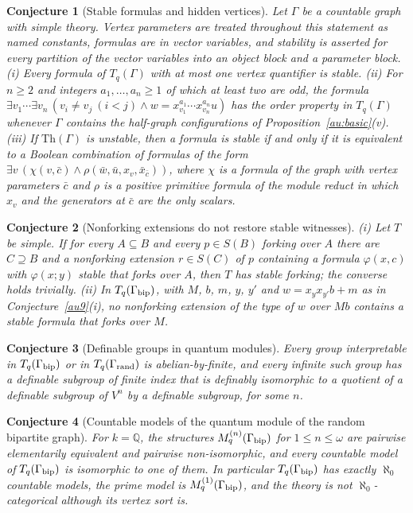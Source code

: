 \documentclass[11pt]{article}
\newtheorem{conjecture}{Conjecture}
\theoremstyle{definition}
\newcommand{\Q}{\mathbb Q}
\providecommand{\Q}{\mathbb Q}
\begin{document}
\begin{conjecture}[Stable formulas and hidden vertices]\label{au12}
Let $\Gamma$ be a countable graph with simple theory.
Vertex parameters are treated throughout this statement as named
constants, formulas are in vector variables, and stability is asserted
for every partition of the vector variables into an object block and a
parameter block.
{\rm(i)} Every formula of $T_q(\Gamma)$ with at most one vertex quantifier
is stable.
{\rm(ii)} For $n\ge2$ and integers $a_1,\dots,a_n\ge1$ of which at least
two are odd, the formula
$\exists v_1\cdots\exists v_n\,(v_i\ne v_j\ (i<j)\wedge w=x_{v_1}^{a_1}\cdots x_{v_n}^{a_n}u)$
has the order property in $T_q(\Gamma)$ whenever $\Gamma$ contains the
half-graph configurations of Proposition~\ref{au:basic}(v).
{\rm(iii)} If $\mathrm{Th}(\Gamma)$ is unstable, then a formula is stable
if and only if it is equivalent
to a Boolean combination of formulas of the form
$\exists v\,(\chi(v,\bar c)\wedge\rho(\bar w,\bar u,x_v,\bar x_{\bar c}))$,
where $\chi$ is a formula of the graph with vertex parameters $\bar c$
and $\rho$ is a positive primitive formula of the module reduct in which
$x_v$ and the generators at $\bar c$ are the only scalars.
\end{conjecture}


\begin{conjecture}[Nonforking extensions do not restore stable witnesses]\label{au13}
{\rm(i)} Let $T$ be simple.  If for every $A\subseteq B$ and every
$p\in S(B)$ forking over $A$ there are $C\supseteq B$ and a nonforking
extension $r\in S(C)$ of $p$ containing a formula $\varphi(x,c)$ with
$\varphi(x;y)$ stable that forks over $A$, then $T$ has stable forking;
the converse holds trivially.
{\rm(ii)} In $T_q(\Gamma_{\rm bip})$, with $M$, $b$, $m$, $y$, $y'$ and
$w=x_yx_{y'}b+m$ as in Conjecture~\ref{au9}(i), no nonforking extension of
the type of $w$ over $Mb$ contains a stable formula that forks over $M$.
\end{conjecture}


\begin{conjecture}[Definable groups in quantum modules]\label{au14}
Every group interpretable in $T_q(\Gamma_{\rm bip})$ or in
$T_q(\Gamma_{\rm rand})$ is abelian-by-finite, and every infinite such group
has a definable subgroup of finite index that is definably isomorphic to
a quotient of a definable subgroup of $V^n$ by a definable subgroup, for
some $n$.
\end{conjecture}


\begin{conjecture}[Countable models of the quantum module of the random bipartite graph]\label{au15}
For $k=\Q$, the structures $M^{(n)}_q(\Gamma_{\rm bip})$ for
$1\le n\le\omega$ are pairwise elementarily equivalent and pairwise
non-isomorphic, and every countable model of $T_q(\Gamma_{\rm bip})$ is
isomorphic to one of them.  In particular $T_q(\Gamma_{\rm bip})$ has
exactly $\aleph_0$ countable models, the prime model is
$M^{(1)}_q(\Gamma_{\rm bip})$, and the theory is not $\aleph_0$-categorical
although its vertex sort is.
\end{conjecture}
\end{document}
